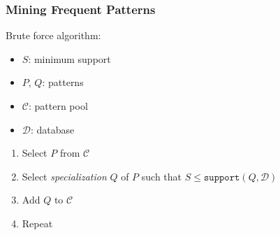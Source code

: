 \documentclass{beamer}
\begin{document}
\begin{frame}
  \frametitle{Mining Frequent Patterns}


  Brute force algorithm:
  \begin{itemize}
  \item $S$: minimum support
  \item $P$, $Q$: patterns
  \item $\mathcal{C}$: pattern pool
  \item $\mathcal{D}$: database
  \end{itemize}
  
  \begin{enumerate}
  \item Select $P$ from $\mathcal{C}$
  \item Select \emph{specialization} $Q$ of $P$ such that $S \leq
    \texttt{support}(Q, \mathcal{D})$
  \item Add $Q$ to $\mathcal{C}$
  \item Repeat
  \end{enumerate}

\end{frame}
\end{document}

